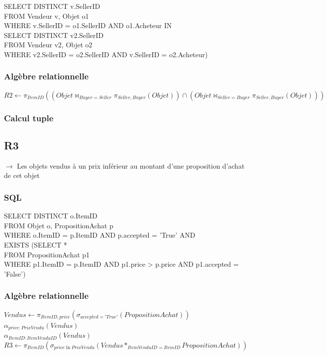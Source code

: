 \documentclass[a4paper,11pt]{article}
\begin{document}
SELECT DISTINCT v.SellerID\\
FROM Vendeur v, Objet o1\\
WHERE v.SellerID = o1.SellerID AND o1.Acheteur IN\\
\indent \indent SELECT DISTINCT v2.SellerID\\
\indent \indent FROM Vendeur v2, Objet o2\\
\indent \indent WHERE v2.SellerID = o2.SellerID AND v.SellerID = o2.Acheteur)
    
\subsubsection{Algèbre relationnelle}
$R2 \leftarrow \pi_{ItemID}((Objet \bowtie_{Buyer=Seller} \pi_{Seller,Buyer}(Objet)) 
			    \cap (Objet \bowtie_{Seller=Buyer} \pi_{Seller,Buyer}(Objet)))$

			    
\subsubsection{Calcul tuple}

\subsection{R3}

$\rightarrow$ Les objets vendus à un prix inférieur au montant d'une proposition d'achat de cet objet

\subsubsection{SQL}

SELECT DISTINCT o.ItemID\\
FROM Objet o, PropositionAchat p\\
WHERE o.ItemID = p.ItemID AND p.accepted = 'True' AND\\
\indent \indent EXISTS (SELECT *\\
\indent \indent FROM PropositionAchat p1\\
\indent \indent WHERE p1.ItemID = p.ItemID AND p1.price > p.price AND p1.accepted = 'False')
        
\subsubsection{Algèbre relationnelle}

$Vendus \leftarrow \pi_{ItemID, price}(\sigma_{accepted='True'}(PropositionAchat))$\\
$\alpha_{price:PrixVendu}(Vendus)$\\
$\alpha_{ItemID:ItemVenduID}(Vendus)$\\
$R3 \leftarrow \pi_{ItemID}(\sigma_{price \ln PrixVendu}(Vendus*_{ItemVenduID=ItemID}PropositionAchat)) $
\end{document}
